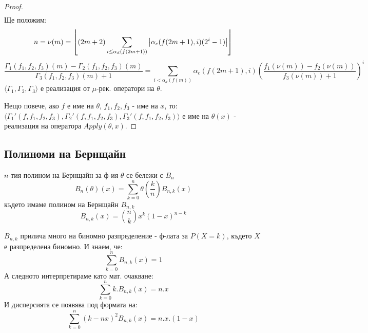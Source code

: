 \begin{proof}
\begin{equation}
\begin{split}
        \end{split}
    \end{equation}
    Ще положим:
    \begin{equation}
        n = \nu(m) = \left\lfloor (2m+2) \sum_{i \leq \alpha_d(f(2m+1))} \left|\alpha_c(f(2m+1), i)(2^i -1)\right| \right\rfloor
    \end{equation}
    \begin{equation}
        \frac{\Gamma_1(f_1, f_2, f_3)(m) - \Gamma_2(f_1, f_2, f_3)(m)}{\Gamma_3(f_1, f_2, f_3)(m) + 1} = \sum_{i < \alpha_d(f(m))} \alpha_c(f(2m+1), i) \left(\frac{f_1(\nu(m)) - f_2(\nu(m))}{f_3(\nu(m)) +1}\right)^i
    \end{equation}
    $\langle \Gamma_1, \Gamma_2, \Gamma_3\rangle$ е реализация от $\mu$-рек. оператори на $\theta$.

    Нещо повече, ако $f$ е име на $\theta$, $f_1, f_2, f_3$ - име на $x$, то: \\
    $\langle \Gamma_1'(f, f_1, f_2, f_3), \Gamma_2'(f, f_1, f_2, f_3), \Gamma_3'(f, f_1, f_2, f_3) \rangle$ е име на $\theta(x)$ - реализация на оператора $Apply(\theta, x)$.
\end{proof}

\subsection{Полиноми на Бернщайн}
\begin{definition}
    $n$-тия полином на Бернщайн за ф-ия $\theta$ се бележи с $B_n$
    \begin{equation}
        B_n(\theta)(x) = \sum_{k=0}^n \theta\left(\frac{k}{n}\right) B_{n,k}(x)
    \end{equation}
    където имаме полином на Бернщайн $B_{n,k}$
    \begin{equation}
        B_{n,k}(x) = \binom{n}{k} x^k (1-x)^{n-k}
    \end{equation}
\end{definition}

$B_{n,k}$ прилича много на биномно разпределение - ф-лата за $P(X=k)$, където $X$ е разпределена биномно. И знаем, че:
\begin{equation}
    \sum_{k=0}^n B_{n,k}(x) = 1
\end{equation}
А следното интерпретираме като мат. очакване:
\begin{equation}
    \sum_{k=0}^n k . B_{n,k}(x) = n.x
\end{equation}
И дисперсията се появява под формата на:
\begin{equation}
    \sum_{k=0}^n (k - nx)^2 B_{n,k}(x) = n.x.(1-x)
\end{equation}

